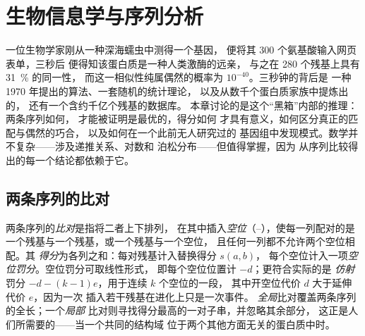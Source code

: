 \chapter{生物信息学与序列分析}\label{ch:b3:bioinformatics}

一位生物学家刚从一种深海蠕虫中测得一个基因，
便将其 \num{300} 个氨基酸输入网页表单，三秒后
便得知该蛋白质是一种人类激酶的远亲，
与之在 \num{280} 个残基上具有 \qty{31}{\%} 的同一性，
而这一相似性纯属偶然的概率为 $10^{-40}$。三秒钟的背后是
一种 1970 年提出的算法、一套随机的统计理论，
以及从数千个蛋白质家族中提炼出的，
还有一个含约千亿个残基的数据库。
本章讨论的是这个“黑箱”内部的推理：两条序列如何，
才能被证明是最优的，得分如何
才具有意义，如何区分真正的匹配与偶然的巧合，
以及如何在一个此前无人研究过的
基因组中发现模式。数学并不复杂——涉及递推关系、对数和
泊松分布——但值得掌握，因为
从序列比较得出的每一个结论都依赖于它。

\section{两条序列的比对}

\begin{definition}[比对与得分]\label{def:b3:bioinformatics:alignment}
两条序列的\emph{比对}是指将二者上下排列，
在其中插入\emph{空位}（--），使每一列配对的是一个残基与一个残基，或一个残基与一个空位，
且任何一列都不允许两个空位相配。其
\emph{得分}为各列之和：每对残基计入替换得分 $s(a,b)$，
每个空位计入一项\emph{空位罚分}。空位罚分可取线性形式，
即每个空位位置计 $-d$；更符合实际的是
\emph{仿射}罚分 $-d - (k-1)e$，用于连续 $k$ 个空位的一段，
其中开空位代价 $d$ 大于延伸代价 $e$，因为一次
插入若干残基在进化上只是一次事件。
\emph{全局}比对覆盖两条序列的全长；一个\emph{局部}
比对则寻找得分最高的一对子串，并忽略其余部分，
这正是人们所需要的——当一个共同的结构域
位于两个其他方面无关的蛋白质中时。
\end{definition}


